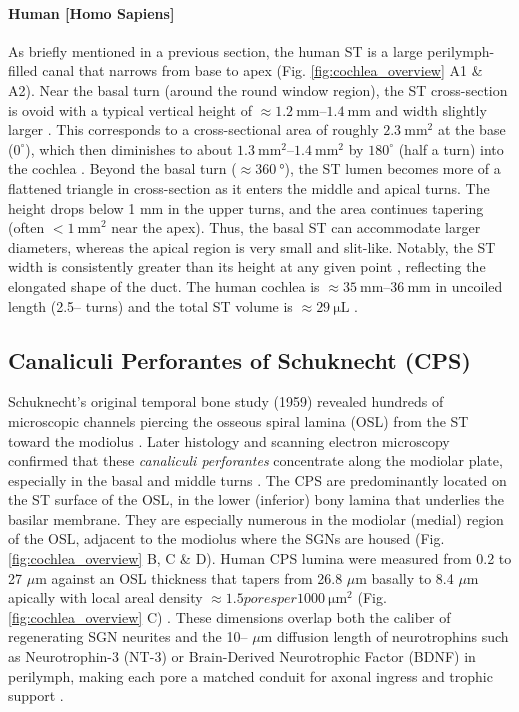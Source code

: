 \documentclass[referee,pdflatex, sn-vancouver-num]{sn-jnl}%
\theoremstyle{thmstyleone}%
\theoremstyle{thmstyletwo}%
\theoremstyle{thmstylethree}%
\DeclareRobustCommand{\textendash}{\ifmmode\text{-}\else\leavevmode\hbox{--}\fi}
\begin{document}
\paragraph{Human [Homo Sapiens]}
As briefly mentioned in a previous section, the human ST is a large perilymph-filled canal that narrows from base to apex (Fig. \ref{fig:cochlea_overview} A1 \& A2). Near the basal turn (around the round window region), the ST cross-section is ovoid with a typical vertical height of $\approx \SIrange{1.2}{1.4}{\mm}$ and width slightly larger \cite{fujiwara2023morphometric}. This corresponds to a cross-sectional area of roughly $\SI{2.3}{\mm^{2}}$ at the base ($0^{\circ}$), which then diminishes to about $\SIrange{1.3}{1.4}{\mm^{2}}$ by $180^{\circ}$ (half a turn) into the cochlea \cite{fujiwara2023morphometric,Micuda2024_Laryngoscope_SRPCI_ST}. Beyond the basal turn ($\approx \SI{360}{\degree}$), the ST lumen becomes more of a flattened triangle in cross-section as it enters the middle and apical turns. The height drops below 1 mm in the upper turns, and the area continues tapering (often $< \SI {1}{\mm}^{2}$ near the apex). Thus, the basal ST can accommodate larger diameters, whereas the apical region is very small and slit-like. Notably, the ST width is consistently greater than its height at any given point \cite{hatsushika1990dimensions}, reflecting the elongated shape of the duct. The human cochlea is $\approx \SIrange{35}{36}{\mm}$ in uncoiled length (2.5\textendash2.7 turns) and the total ST volume is $\approx \SI{29}{\micro\liter}$ \cite{Liu2023FEA}.

\subsection{Canaliculi Perforantes of Schuknecht (CPS)}  
Schuknecht's original temporal bone study (1959) revealed hundreds of microscopic channels piercing the osseous spiral lamina (OSL) from the ST toward the modiolus \cite{Schuknecht1959}. Later histology and scanning electron microscopy confirmed that these \textit{canaliculi perforantes} concentrate along the modiolar plate, especially in the basal and middle turns \cite{schuknecht1963, Schuknecht1959,lim1970, masuda1971,sando1971, tanaka1973, tanaka1976}. The CPS are predominantly located on the ST surface of the OSL, in the lower (inferior) bony lamina that underlies the basilar membrane. They are especially numerous in the modiolar (medial) region of the OSL, adjacent to the modiolus where the SGNs are housed \cite{shepherd2004} (Fig. \ref{fig:cochlea_overview} B, C \& D). Human CPS lumina were measured from 0.2 to 27 $\mu$m against an OSL thickness that tapers from 26.8 $\mu$m basally to 8.4 $\mu$m apically with local areal density $\approx 1.5 pores per \SI{1000}{\micro\meter\squared}$ (Fig. \ref{fig:cochlea_overview} C) \cite{shepherd2004, Braga2023_JARO_OSLmicroCT}. These dimensions overlap both the caliber of regenerating SGN neurites and the 10\textendash30 $\mu$m diffusion length of neurotrophins such as Neurotrophin-3 (NT-3) or Brain-Derived Neurotrophic Factor (BDNF) in perilymph, making each pore a matched conduit for axonal ingress and trophic support \cite{Green2012}.
\end{document}
